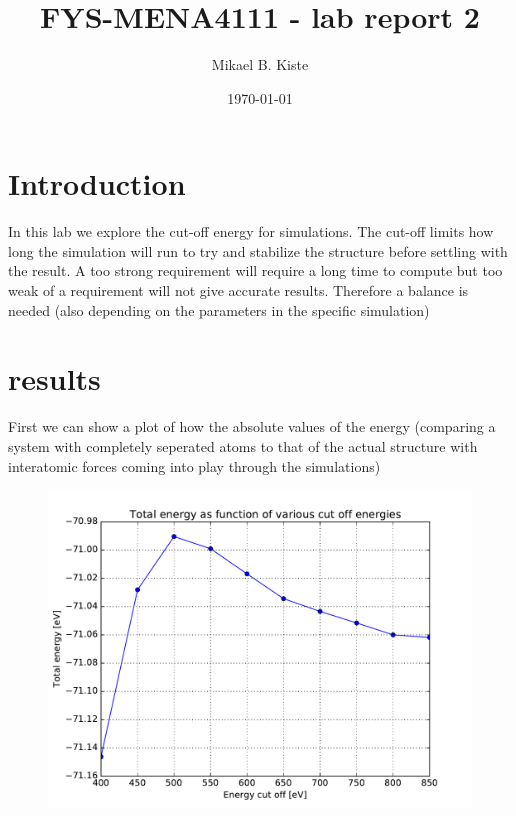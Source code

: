 \documentclass[a4paper,10pt]{article}
\date{\today}
\title{FYS-MENA4111 - lab report 2}
\author{Mikael B. Kiste}
\begin{document}
  \maketitle
  \tableofcontents
  \newpage
  \section{Introduction}
  In this lab we explore the cut-off energy for simulations. The cut-off limits how long the simulation will run to try and stabilize the structure before settling with the result. A too strong requirement will require a long time to compute but too weak of a requirement will not give accurate results. Therefore a balance is needed (also depending on the parameters in the specific simulation)
	\section{results}
	First we can show a plot of how the absolute values of the energy (comparing a system with completely seperated atoms to that of the actual structure with interatomic forces coming into play through the simulations)
	\begin{figure}[h]
		\begin{center}
		\includegraphics[width=0.9\linewidth]{TOTENplot.pdf}
		\end{center}
	\end{figure}
\end{document}
